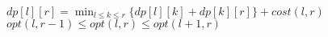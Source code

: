 
$ dp[l][r] = \min_{l \leq k \leq r}\{dp[l][k] + dp[k][r]\} + cost(l, r)$ \\

$ opt(l, r - 1) \leq opt(l, r) \leq opt(l + 1, r) $ \\